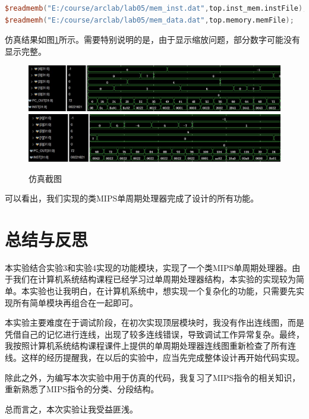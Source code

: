 \documentclass[UTF8]{ctexart}
\begin{document}
\begin{lstlisting}[language=verilog]
$readmemb("E:/course/arclab/lab05/mem_inst.dat",top.inst_mem.instFile);
$readmemh("E:/course/arclab/lab05/mem_data.dat",top.memory.memFile);
\end{lstlisting}\par
仿真结果如图\ref{fig:sim-res}所示。需要特别说明的是，由于显示缩放问题，部分数字可能没有显示完整。
\begin{figure}[H]
    \centering
    \includegraphics[width=\textwidth]{fig-lab5-sim1.jpg}
    \includegraphics[width=\textwidth]{fig-lab5-sim2.jpg}
    \caption{仿真截图}
    \label{fig:sim-res}
\end{figure}\par
可以看出，我们实现的类MIPS单周期处理器完成了设计的所有功能。

\section{总结与反思}
本实验结合实验3和实验4实现的功能模块，实现了一个类MIPS单周期处理器。由于我们在计算机系统结构课程已经学习过单周期处理器结构，本实验的实现较为简单。本实验也让我明白，在计算机系统中，想实现一个复杂化的功能，只需要先实现所有简单模块再组合在一起即可。\par
本实验主要难度在于调试阶段，在初次实现顶层模块时，我没有作出连线图，而是凭借自己的记忆进行连线，出现了较多连线错误，导致调试工作异常复杂。最终，我按照计算机系统结构课程课件上提供的单周期处理器连线图重新检查了所有连线。这样的经历提醒我，在以后的实验中，应当先完成整体设计再开始代码实现。\par
除此之外，为编写本次实验中用于仿真的代码，我复习了MIPS指令的相关知识，重新熟悉了MIPS指令的分类、分段结构。\par
总而言之，本次实验让我受益匪浅。
\end{document}
